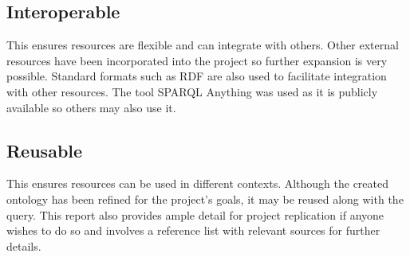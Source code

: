 \subsection{Interoperable}
\hspace{0.5cm} This ensures resources are flexible and can integrate with others. Other external resources have been incorporated into the project so further expansion is very possible. Standard formats such as RDF are also used to facilitate integration with other resources. The tool SPARQL Anything was used as it is publicly available so others may also use it. 

\subsection{Reusable}
\hspace{0.5cm} This ensures resources can be used in different contexts. Although the created ontology has been refined for the project's goals, it may be reused along with the query. This report also provides ample detail for project replication if anyone wishes to do so and involves a reference list with relevant sources for further details. 
